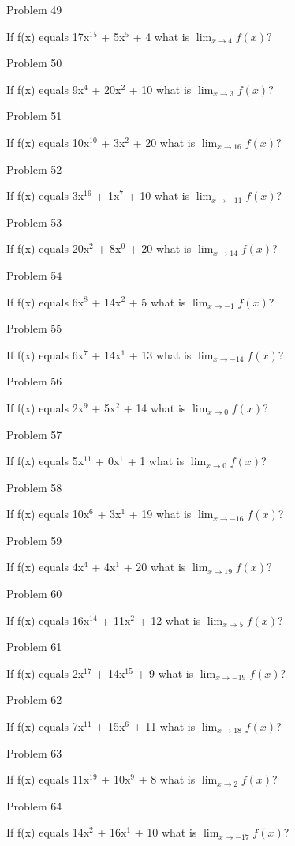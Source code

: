\documentclass{article}
\begin{document}
Problem 49

If f(x) equals 17x$^{15}$ + 5x$^{5}$ + 4 what is $\lim_{x\to 4} f(x) $?

Problem 50

If f(x) equals 9x$^{4}$ + 20x$^{2}$ + 10 what is $\lim_{x\to 3} f(x) $?

Problem 51

If f(x) equals 10x$^{10}$ + 3x$^{2}$ + 20 what is $\lim_{x\to 16} f(x) $?

Problem 52

If f(x) equals 3x$^{16}$ + 1x$^{7}$ + 10 what is $\lim_{x\to -11} f(x) $?

Problem 53

If f(x) equals 20x$^{2}$ + 8x$^{0}$ + 20 what is $\lim_{x\to 14} f(x) $?

Problem 54

If f(x) equals 6x$^{8}$ + 14x$^{2}$ + 5 what is $\lim_{x\to -1} f(x) $?

Problem 55

If f(x) equals 6x$^{7}$ + 14x$^{1}$ + 13 what is $\lim_{x\to -14} f(x) $?

Problem 56

If f(x) equals 2x$^{9}$ + 5x$^{2}$ + 14 what is $\lim_{x\to 0} f(x) $?

Problem 57

If f(x) equals 5x$^{11}$ + 0x$^{1}$ + 1 what is $\lim_{x\to 0} f(x) $?

Problem 58

If f(x) equals 10x$^{6}$ + 3x$^{1}$ + 19 what is $\lim_{x\to -16} f(x) $?

Problem 59

If f(x) equals 4x$^{4}$ + 4x$^{1}$ + 20 what is $\lim_{x\to 19} f(x) $?

Problem 60

If f(x) equals 16x$^{14}$ + 11x$^{2}$ + 12 what is $\lim_{x\to 5} f(x) $?

Problem 61

If f(x) equals 2x$^{17}$ + 14x$^{15}$ + 9 what is $\lim_{x\to -19} f(x) $?

Problem 62

If f(x) equals 7x$^{11}$ + 15x$^{6}$ + 11 what is $\lim_{x\to 18} f(x) $?

Problem 63

If f(x) equals 11x$^{19}$ + 10x$^{9}$ + 8 what is $\lim_{x\to 2} f(x) $?

Problem 64

If f(x) equals 14x$^{2}$ + 16x$^{1}$ + 10 what is $\lim_{x\to -17} f(x) $?
\end{document}
